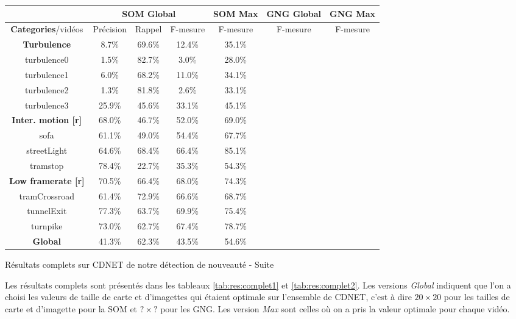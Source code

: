 	\begin{tableth}
    \begin{tabular}{|c|c|c|c|c|c|c|}
		\hline
		& \multicolumn{3}{c|}{SOM Global} & SOM Max & GNG Global & GNG Max\\
        \hline
        \textbf{Categories}/vidéos & Précision & Rappel & F-mesure & F-mesure & F-mesure & F-mesure\\
		\hline
        \textbf{Turbulence} & 8.7\% & 69.6\% & 12.4\% & 35.1\% & &\\
		\hline
turbulence0 & 1.5\% & 82.7\% & 3.0\% & 28.0\% & &\\
turbulence1 & 6.0\% & 68.2\% & 11.0\% & 34.1\% & &\\
turbulence2 & 1.3\% & 81.8\% & 2.6\% & 33.1\% & &\\
turbulence3 & 25.9\% & 45.6\% & 33.1\% & 45.1\% & &\\

		\hline
		\textbf{Inter. motion [r]} & 68.0\% & 46.7\% & 52.0\% & 69.0\% & &\\
		\hline
sofa & 61.1\% & 49.0\% & 54.4\% & 67.7\% & &\\
streetLight & 64.6\% & 68.4\% & 66.4\% & 85.1\% & &\\
tramstop & 78.4\% & 22.7\% & 35.3\% & 54.3\% & &\\
		\hline
        \textbf{Low framerate [r]} & 70.5\% & 66.4\% & 68.0\% & 74.3\% & &\\
		\hline
tramCrossroad & 61.4\% & 72.9\% & 66.6\% & 68.7\% & &\\
tunnelExit & 77.3\% & 63.7\% & 69.9\% & 75.4\% & &\\
turnpike & 73.0\% & 62.7\% & 67.4\% & 78.7\% & &\\

        \hline
        \textbf{Global} & 41.3\% & 62.3\% & 43.5\% & 54.6\% & &\\
    	\hline
	\end{tabular}
	\caption{Résultats complets sur CDNET de notre détection de nouveauté - Suite}
	\label{tab:res:complet2}
	\end{tableth}

	Les résultats complets sont présentés dans les tableaux \ref{tab:res:complet1} et \ref{tab:res:complet2}. Les versions \textit{Global} indiquent que l'on a choisi les valeurs de taille de carte et d'imagettes qui étaient optimale sur l'ensemble de CDNET, c'est à dire $20\times20$ pour les tailles de carte et d'imagette pour la SOM et $?\times?$ pour les GNG. Les version \textit{Max} sont celles où on a pris la valeur optimale pour chaque vidéo.

